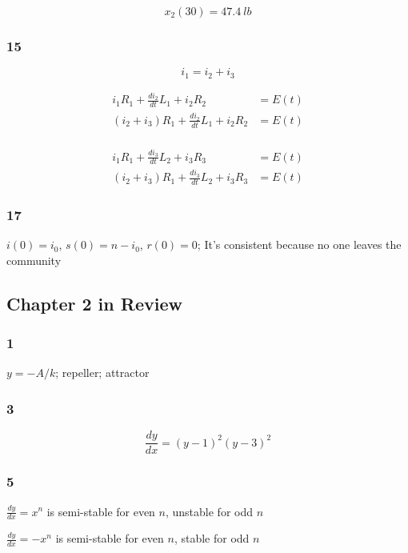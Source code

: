 \documentclass{article}
\begin{document}
\begin{enumerate}
        \[x_2(30) = \qty{47.4}{lb}\]
\end{enumerate}

\subsubsection{15}

\[i_1 = i_2 + i_3\]

\begin{align*}
  i_1 R_1 + \frac{di_2}{dt} L_1 + i_2 R_2         & = E(t) \\
  (i_2 + i_3) R_1 + \frac{di_2}{dt} L_1 + i_2 R_2 & = E(t) \\
\end{align*}

\begin{align*}
  i_1 R_1 + \frac{di_3}{dt} L_2 + i_3 R_3         & = E(t) \\
  (i_2 + i_3) R_1 + \frac{di_3}{dt} L_2 + i_3 R_3 & = E(t)
\end{align*}

\subsubsection{17}

$i(0) = i_0$, $s(0) = n - i_0$, $r(0) = 0$; It's consistent because no one leaves the community

\subsection{Chapter 2 in Review}

\subsubsection{1}

$y = -A / k$; repeller; attractor

\subsubsection{3}

\[\frac{dy}{dx} = (y - 1)^2 (y - 3)^2\]

\subsubsection{5}

$\frac{dy}{dx} = x^n$ is semi-stable for even $n$, unstable for odd $n$

$\frac{dy}{dx} = -x^n$ is semi-stable for even $n$, stable for odd $n$
\end{document}
